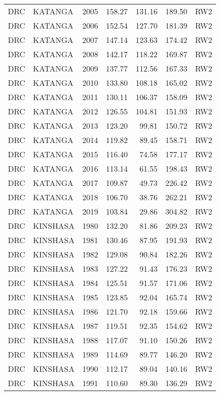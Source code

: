\begin{longtable}{lllrrrl}
  DRC & KATANGA & 2005 & 158.27 & 131.16 & 189.50 & RW2 \\ 
  DRC & KATANGA & 2006 & 152.54 & 127.70 & 181.39 & RW2 \\ 
  DRC & KATANGA & 2007 & 147.14 & 123.63 & 174.42 & RW2 \\ 
  DRC & KATANGA & 2008 & 142.17 & 118.22 & 169.87 & RW2 \\ 
  DRC & KATANGA & 2009 & 137.77 & 112.56 & 167.33 & RW2 \\ 
  DRC & KATANGA & 2010 & 133.80 & 108.18 & 165.02 & RW2 \\ 
  DRC & KATANGA & 2011 & 130.11 & 106.37 & 158.09 & RW2 \\ 
  DRC & KATANGA & 2012 & 126.55 & 104.81 & 151.93 & RW2 \\ 
  DRC & KATANGA & 2013 & 123.20 & 99.81 & 150.72 & RW2 \\ 
  DRC & KATANGA & 2014 & 119.82 & 89.45 & 158.71 & RW2 \\ 
  DRC & KATANGA & 2015 & 116.40 & 74.58 & 177.17 & RW2 \\ 
  DRC & KATANGA & 2016 & 113.14 & 61.55 & 198.43 & RW2 \\ 
  DRC & KATANGA & 2017 & 109.87 & 49.73 & 226.42 & RW2 \\ 
  DRC & KATANGA & 2018 & 106.70 & 38.76 & 262.21 & RW2 \\ 
  DRC & KATANGA & 2019 & 103.84 & 29.86 & 304.82 & RW2 \\ 
  DRC & KINSHASA & 1980 & 132.20 & 81.86 & 209.23 & RW2 \\ 
  DRC & KINSHASA & 1981 & 130.46 & 87.95 & 191.93 & RW2 \\ 
  DRC & KINSHASA & 1982 & 129.08 & 90.84 & 182.26 & RW2 \\ 
  DRC & KINSHASA & 1983 & 127.22 & 91.43 & 176.23 & RW2 \\ 
  DRC & KINSHASA & 1984 & 125.51 & 91.57 & 171.06 & RW2 \\ 
  DRC & KINSHASA & 1985 & 123.85 & 92.04 & 165.74 & RW2 \\ 
  DRC & KINSHASA & 1986 & 121.70 & 92.18 & 159.66 & RW2 \\ 
  DRC & KINSHASA & 1987 & 119.51 & 92.35 & 154.62 & RW2 \\ 
  DRC & KINSHASA & 1988 & 117.07 & 91.10 & 150.26 & RW2 \\ 
  DRC & KINSHASA & 1989 & 114.69 & 89.77 & 146.20 & RW2 \\ 
  DRC & KINSHASA & 1990 & 112.17 & 89.04 & 140.16 & RW2 \\ 
  DRC & KINSHASA & 1991 & 110.60 & 89.30 & 136.29 & RW2 \\ 

\end{longtable}
